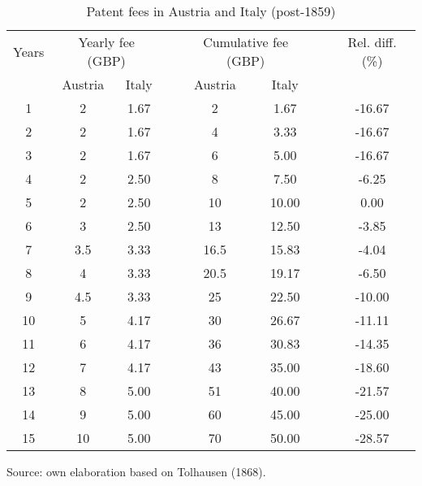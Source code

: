 \begin{table}[!h]
\caption{\label{tab:pat_fees} Patent fees in Austria and Italy (post-1859)}
\centering

    \begin{tabular}{cccccccc}
        \hline
        Years & \multicolumn{2}{c}{Yearly fee (GBP)} &   & \multicolumn{2}{c}{Cumulative fee (GBP)} &   & Rel. diff. (\%) \\
        \cline{2-3}\cline{5-6}  & Austria & Italy &   & Austria & Italy &   &  \\
        \hline
        1 & 2 & 1.67 &   & 2 & 1.67 &   & -16.67 \\
        2 & 2 & 1.67 &   & 4 & 3.33 &   & -16.67 \\
        3 & 2 & 1.67 &   & 6 & 5.00 &   & -16.67 \\
        4 & 2 & 2.50 &   & 8 & 7.50 &   & -6.25 \\
        5 & 2 & 2.50 &   & 10 & 10.00 &   & 0.00 \\
        6 & 3 & 2.50 &   & 13 & 12.50 &   & -3.85 \\
        7 & 3.5 & 3.33 &   & 16.5 & 15.83 &   & -4.04 \\
        8 & 4 & 3.33 &   & 20.5 & 19.17 &   & -6.50 \\
        9 & 4.5 & 3.33 &   & 25 & 22.50 &   & -10.00 \\
        10 & 5 & 4.17 &   & 30 & 26.67 &   & -11.11 \\
        11 & 6 & 4.17 &   & 36 & 30.83 &   & -14.35 \\
        12 & 7 & 4.17 &   & 43 & 35.00 &   & -18.60 \\
        13 & 8 & 5.00 &   & 51 & 40.00 &   & -21.57 \\
        14 & 9 & 5.00 &   & 60 & 45.00 &   & -25.00 \\
        15 & 10 & 5.00 &   & 70 & 50.00 &   & -28.57 \\
        \hline
    \end{tabular}%
        
    Source: own elaboration based on Tolhausen (1868).

\smallskip
    
\end{table}